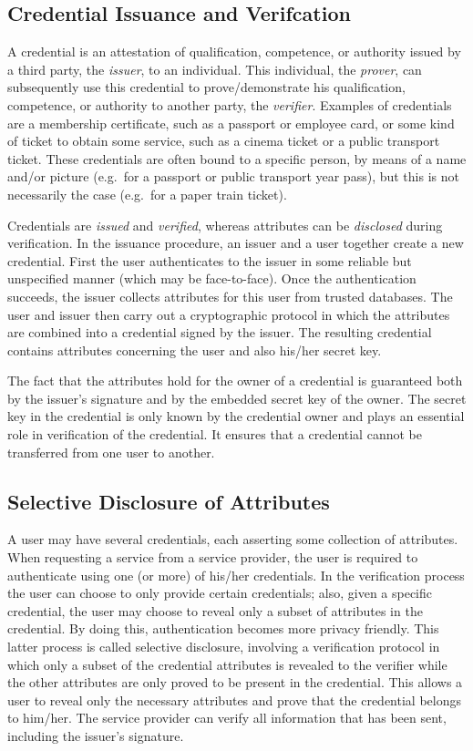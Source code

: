 \subsection{Credential Issuance and Verifcation}

A credential is an attestation of qualification, competence, or authority
issued by a third party, the \emph{issuer}, to an individual. This
individual, the \emph{prover}, can subsequently use this credential to
prove\slash demonstrate his qualification, competence, or authority to
another party, the \emph{verifier}. Examples of credentials are a
membership certificate, such as a passport or employee card, or some kind
of ticket to obtain some service, such as a cinema ticket or a public
transport ticket. These credentials are often bound to a specific person,
by means of a name and\slash or picture (e.g.\ for a passport or public
transport year pass), but this is not necessarily the case (e.g.\ for a
paper train ticket).

Credentials are \emph{issued} and \emph{verified}, whereas attributes can be
\emph{disclosed} during verification. In the issuance procedure, an issuer and
a user together create a new credential. First the user authenticates to the
issuer in some reliable but unspecified manner (which may be face-to-face). Once
the authentication succeeds, the issuer collects attributes for this user from
trusted databases. The user and issuer then carry out a cryptographic protocol
in which the attributes are combined into a credential signed by the issuer. The
resulting credential contains attributes concerning the user and also his/her
secret key.

The fact that the attributes hold for the owner of a credential is guaranteed
both by the issuer's signature and by the embedded secret key of the owner. The
secret key in the credential is only known by the credential owner and plays an
essential role in verification of the credential. It ensures that a credential
cannot be transferred from one user to another.

\subsection{Selective Disclosure of Attributes}

A user may have several credentials, each asserting some collection of
attributes. When requesting a service from a service provider, the user is
required to authenticate using one (or more) of his/her credentials. In the
verification process the user can choose to only provide certain credentials;
also, given a specific credential, the user may choose to reveal only a subset
of attributes in the credential. By doing this, authentication becomes more
privacy friendly. This latter process is called selective disclosure, involving
a verification protocol in which only a subset of the credential attributes is
revealed to the verifier while the other attributes are only proved to be
present in the credential. This allows a user to reveal only the necessary
attributes and prove that the credential belongs to him/her. The service
provider can verify all information that has been sent, including the issuer's
signature.


